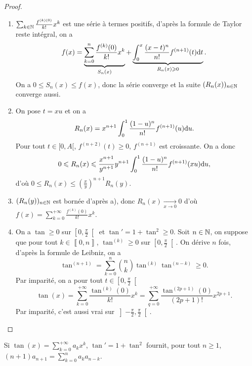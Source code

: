 \documentclass[12pt]{article}
\begin{document}
\begin{proof}
    \phantom{}
    \begin{enumerate}
        \item $\sum_{k\in\mathbb{N}}\frac{f^{(k)(0)}}{k!}x^{k}$ est une série à termes positifs, d'après la formule de Taylor reste intégral, on a 
        \begin{equation}
            f(x)=\underbrace{\sum_{k=0}^{n}\frac{f^{(k)}(0)}{k!}x^{k}}_{S_n(x)}+\underbrace{\int_{0}^{x}\frac{(x-t)^{n}}{n!}f^{(n+1)}(t)\mathrm{d} t}_{R_n(x)\geqslant0}.
        \end{equation}
        On a $0\leqslant S_n(x)\leqslant f(x)$, donc la série converge et la suite $(R_n(x))_{n\in\mathbb{N}}$ converge aussi.

        \item On pose $t=xu$ et on a 
        \begin{equation}
            R_n(x)=x^{n+1}\int_{0}^{1}\frac{(1-u)^{n}}{n!}f^{(n+1)}(u)\mathrm{d} u.
        \end{equation}
        Pour tout $t\in[0,A[$, $f^{(n+2)}(t)\geqslant0$, $f^{(n+1)}$ est croissante. On a donc 
        \begin{equation}
            0\leqslant R_n(x)\leqslant\frac{x^{n+1}}{y^{n+1}}y^{n+1}\int_{0}^{1}\frac{(1-u)^{n}}{n!}f^{(n+1)}(xu)\mathrm{d} u,    
        \end{equation}
        d'où $0\leqslant R_n(x)\leqslant\left(\frac{x}{y}\right)^{n+1}R_n(y)$.

        \item $(R_n(y))_{n\in\mathbb{N}}$ est bornée d'après a), donc $R_n(x)\xrightarrow[x\to0]{}0$ d'où $f(x)=\sum_{k=0}^{+\infty}\frac{f^{(k)}(0)}{k!}x^{k}$.
        
        \item On a $\tan\geqslant0$ sur $\left[0,\frac{\pi}{2}\right[$ et $\tan'=1+\tan^{2}\geqslant0$. Soit $n\in\mathbb{N}$, on suppose que pour tout $k\in\left\llbracket0,n\right\rrbracket$, $\tan^{(k)}\geqslant0$ sur $\left[0,\frac{\pi}{2}\right[$. On dérive $n$ fois, d'après la formule de Leibniz, on a 
        \begin{equation}
            \tan^{(n+1)}=\sum_{k=0}^{n}\binom{n}{k}\tan^{(k)}\tan^{(n-k)}\geqslant0.
        \end{equation}
        Par imparité, on a pour tout $t\in\left[0,\frac{\pi}{2}\right[$
        \begin{equation}
            \tan(x)=\sum_{k=0}^{+\infty}\frac{\tan^{(k)}(0)}{k!}x^{k}=\sum_{q=0}^{+\infty}\frac{\tan^{(2p+1)}(0)}{(2p+1)!}x^{2p+1}.
        \end{equation}
        Par imparité, c'est aussi vrai sur $\left]-\frac{\pi}{2},\frac{\pi}{2}\right[$.
    \end{enumerate}
\end{proof}

\begin{remark}
    Si $\tan(x)=\sum_{k=0}^{+\infty}a_k x^{k}$, $\tan'=1+\tan^{2}$ fournit, pour tout $n\geqslant1$, $(n+1)a_{n+1}=\sum_{k=0}^{n}a_{k}a_{n-k}$.
\end{remark}
\end{document}
